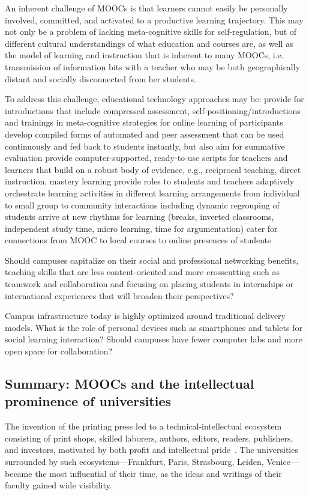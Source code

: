 An inherent challenge of MOOCs is
that learners cannot easily be personally involved, committed, and
activated to a productive learning trajectory. This may not only be a
problem of lacking meta-cognitive skills for self-regulation, but
of different cultural understandings of what education and  courses are, as
well as the model of learning and instruction that is inherent to many
MOOCs, i.e. transmission of information bits with a teacher who may be
both geographically distant and socially disconnected from her students.

To address this challenge, educational technology
approaches may be: provide for introductions that include compressed
assessment, self-positioning/introductions and trainings in
meta-cognitive strategies for online learning of participants develop
compiled forms of automated and peer assessment that can be used
continuously and fed back to students instantly, but also aim for
summative evaluation provide computer-supported, ready-to-use scripts
for teachers and learners that build on a robust body of evidence, e.g.,
reciprocal teaching, direct instruction, mastery learning provide roles
to students and teachers adaptively orchestrate learning activities in
different learning arrangements from individual to small group to
community interactions including dynamic regrouping of students arrive
at new rhythms for learning (breaks, inverted classrooms, independent
study time, micro learning, time for argumentation) cater for
connections from MOOC to local courses to online presences of students

 Should campuses capitalize on their social and professional
  networking benefits, teaching skills that are less content-oriented
  and more crosscutting such as teamwork and collaboration and focusing
  on placing students in internships or international experiences that
  will broaden their perspectives?

 Campus infrastructure today is highly optimized around traditional
  delivery models.  What is
the role of personal devices such as smartphones and tablets for social
learning interaction? Should campuses 
  have fewer computer labs and more open space for collaboration?  


\subsection{Summary: MOOCs and the intellectual prominence of universities}

The invention of the printing press led to a  technical-intellectual
ecosystem consisting of print shops, skilled laborers,
authors, editors, readers, publishers, and investors, motivated by both
profit and intellectual pride~\cite{febvre}.
The universities surrounded by such ecosystems---Frankfurt, Paris,
Strasbourg, Leiden, Venice---became the most influential of their
time, as the ideas and writings of their faculty gained wide visibility.

